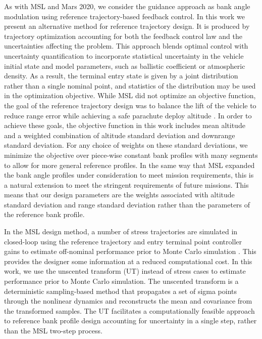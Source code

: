 \documentclass[journal ]{new-aiaa}
\begin{document}
As with MSL and Mars 2020, we consider the guidance approach as bank angle modulation using reference trajectory-based feedback control. In this work we present an alternative method for reference trajectory design. It is produced by trajectory optimization accounting for both the feedback control law and the uncertainties affecting the problem. This approach blends optimal control with uncertainty quantification to incorporate statistical uncertainty in the vehicle initial state and model parameters, such as ballistic coefficient or atmospheric density. As a result, the terminal entry state is given by a joint distribution rather than a single nominal point, and statistics of the distribution may be used in the optimization objective. While MSL did not optimize an objective function, the goal of the reference trajectory design was to balance the lift of the vehicle to reduce range error while achieving a safe parachute deploy altitude \cite{MSL_EDL2}. In order to achieve these goals, the objective function in this work includes mean altitude and a weighted combination of altitude standard deviation and downrange standard deviation. For any choice of weights on these standard deviations, we minimize the objective over piece-wise constant bank profiles with many segments to allow for more general reference profiles. In the same way that MSL expanded the bank angle profiles under consideration to meet mission requirements, this is a natural extension to meet the stringent requirements of future missions. This means that our design parameters are the weights associated with altitude standard deviation and range standard deviation rather than the parameters of the reference bank profile. 

In the MSL design method, a number of stress trajectories are simulated in closed-loop using the reference trajectory and entry terminal point controller gains to estimate off-nominal performance prior to Monte Carlo simulation \cite{MSL_EDL2}. This provides the designer some information at a reduced computational cost. In this work, we use the unscented transform (UT) \cite{UT1997} instead of stress cases to estimate performance prior to Monte Carlo simulation. The unscented transform is a deterministic sampling-based method that propagates a set of sigma points through the nonlinear dynamics and reconstructs the mean and covariance from the transformed samples. The UT facilitates a computationally feasible approach to reference bank profile design accounting for uncertainty in a single step, rather than the MSL two-step process.
\end{document}
